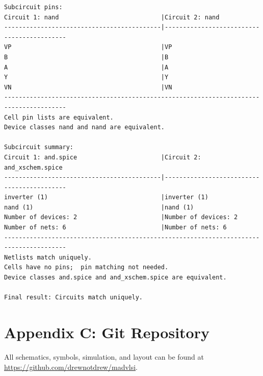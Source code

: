 \documentclass[11pt]{article}
\begin{document}
\begin{lstlisting}
Subcircuit pins:
Circuit 1: nand                            |Circuit 2: nand                            
-------------------------------------------|-------------------------------------------
VP                                         |VP                                         
B                                          |B                                          
A                                          |A                                          
Y                                          |Y                                          
VN                                         |VN                                         
---------------------------------------------------------------------------------------
Cell pin lists are equivalent.
Device classes nand and nand are equivalent.

Subcircuit summary:
Circuit 1: and.spice                       |Circuit 2: and_xschem.spice                
-------------------------------------------|-------------------------------------------
inverter (1)                               |inverter (1)                               
nand (1)                                   |nand (1)                                   
Number of devices: 2                       |Number of devices: 2                       
Number of nets: 6                          |Number of nets: 6                          
---------------------------------------------------------------------------------------
Netlists match uniquely.
Cells have no pins;  pin matching not needed.
Device classes and.spice and and_xschem.spice are equivalent.

Final result: Circuits match uniquely.
\end{lstlisting}

\newpage

\section*{Appendix C: Git Repository}

All schematics, symbols, simulation, and layout can be found at \href{https://github.com/drewnotdrew/madvlsi}{https://github.com/drewnotdrew/madvlsi}.
\end{document}
